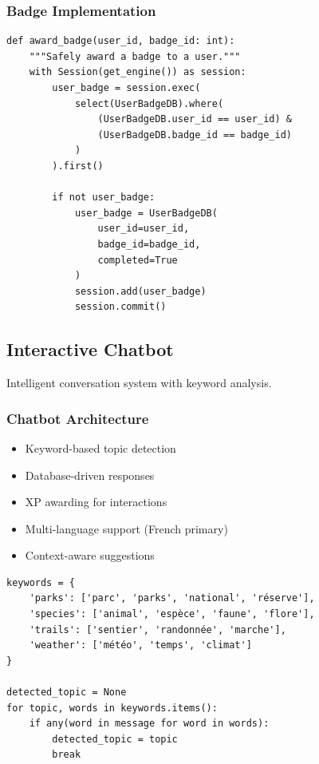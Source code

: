 \documentclass[11pt,a4paper]{article}
\begin{document}
\subsubsection{Badge Implementation}

\begin{lstlisting}[caption=Badge Awarding Logic]
def award_badge(user_id, badge_id: int):
    """Safely award a badge to a user."""
    with Session(get_engine()) as session:
        user_badge = session.exec(
            select(UserBadgeDB).where(
                (UserBadgeDB.user_id == user_id) &
                (UserBadgeDB.badge_id == badge_id)
            )
        ).first()

        if not user_badge:
            user_badge = UserBadgeDB(
                user_id=user_id,
                badge_id=badge_id,
                completed=True
            )
            session.add(user_badge)
            session.commit()
\end{lstlisting}

\subsection{Interactive Chatbot}

Intelligent conversation system with keyword analysis.

\subsubsection{Chatbot Architecture}
\begin{itemize}
    \item Keyword-based topic detection
    \item Database-driven responses
    \item XP awarding for interactions
    \item Multi-language support (French primary)
    \item Context-aware suggestions
\end{itemize}

\begin{lstlisting}[caption=Chatbot Topic Detection]
keywords = {
    'parks': ['parc', 'parks', 'national', 'réserve'],
    'species': ['animal', 'espèce', 'faune', 'flore'],
    'trails': ['sentier', 'randonnée', 'marche'],
    'weather': ['météo', 'temps', 'climat']
}

detected_topic = None
for topic, words in keywords.items():
    if any(word in message for word in words):
        detected_topic = topic
        break
\end{lstlisting}
\end{document}
